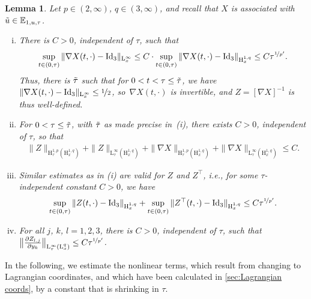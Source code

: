 \documentclass[10pt]{amsart}
\theoremstyle{plain}
\newtheorem{lem}[lem]{Lemma}
\theoremstyle{definition}
\theoremstyle{thm}
\numberwithin{equation}{section}
\newcommand{\rL}{\mathrm{L}}
\newcommand{\rH}{\mathrm{H}}
\newcommand{\E}{\mathbb{E}}
\newcommand{\del}{\partial}
\newcommand{\tu}{\Tilde{u}}
\begin{document}
\begin{lem}\label{lem:ests of trafo}
Let $p \in (2,\infty)$, $q \in (3,\infty)$, and recall that $X$ is associated with $\tu \in \E_{1,u,\tau}$.
\begin{enumerate}[(i)]
    \item There is $C > 0$, independent of $\tau$, such that
    \begin{equation*}
        \sup_{t \in (0,\tau)} \| \nabla X(t,\cdot) - \mathrm{Id}_3 \|_{\rL_x^\infty} \le C \cdot \sup_{t \in (0,\tau)} \| \nabla X(t,\cdot) - \mathrm{Id}_3 \|_{\rH_x^{1,q}} \le C \tau^{\nicefrac{1}{p'}}.
    \end{equation*}
    Thus, there is $\Tilde{\tau}$ such that for $0 < t < \tau \le \Tilde{\tau}$, we have $\| \nabla X(t,\cdot) - \mathrm{Id}_3 \|_{\rL_x^\infty} \le \nicefrac{1}{2}$, so~$\nabla X(t,\cdot)$ is invertible, and $Z = [\nabla X]^{-1}$ is thus well-defined.
    \item For $0 < \tau \le \Tilde{\tau}$, with $\Tilde{\tau}$ as made precise in~(i), there exists $C > 0$, independent of $\tau$, so that
    \begin{equation*}
        \begin{aligned}
            \| Z \|_{\rH_\tau^{1,p}(\rH_x^{1,q})} + \| Z \|_{\rL_\tau^\infty(\rH_x^{1,q})} + \| \nabla X \|_{\rH_\tau^{1,p}(\rH_x^{1,q})} + \| \nabla X \|_{\rL_\tau^\infty(\rH_x^{1,q})} \le C.
        \end{aligned}
    \end{equation*}
    \item Similar estimates as in (i) are valid for $Z$ and $Z^\top$, i.e., for some $\tau$-independent constant $C > 0$, we have
    \begin{equation*}
        \sup_{t \in (0,\tau)} \| Z(t,\cdot) - \mathrm{Id}_3 \|_{\rH_x^{1,q}} + \sup_{t \in (0,\tau)} \| Z^\top(t,\cdot) - \mathrm{Id}_3 \|_{\rH_x^{1,q}} \le C \tau^{\nicefrac{1}{p'}}.
    \end{equation*}
    \item For all $j$, $k$, $l = 1,2,3$, there is $C > 0$, independent of $\tau$, such that~$\bigl\| \frac{\del Z_{l,j}}{\del y_k} \bigr\|_{\rL_\tau^\infty(\rL_x^q)} \le C \tau^{\nicefrac{1}{p'}}$.
\end{enumerate}
\end{lem}

In the following, we estimate the nonlinear terms, which result from changing to Lagrangian coordinates, and which have been calculated in \autoref{sec:Lagrangian coords}, by a constant that is shrinking in $\tau$.
\end{document}
